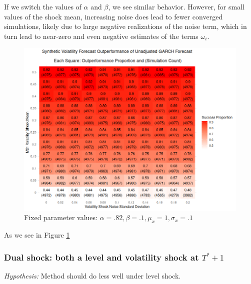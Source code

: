 \documentclass[11pt]{article}
\theoremstyle{definition}
\begin{document}
If we switch the values of $\alpha$ and $\beta$, we see similar behavior.  However, for small values of the shock mean, increasing noise does lead to fewer converged simulations, likely due to large negative realizations of the noise term, which in turn lead to near-zero and even negative estimates of the terms $\omega_{i}$.
\begin{figure}[h!]
  \begin{center}
    \includegraphics[scale=.45]{simulation_plots/standard_simulation_alpha_.82_beta_.1.png}
    \caption{Fixed parameter values: $\alpha = .82, \beta = .1, \mu_{x} = 1, \sigma_{x} = .1$}
    \label{fig:heavy_alpha}
  \end{center}
  \end{figure}
  
As we see in Figure \ref{fig:heavy_alpha}

\subsubsection{Dual shock: both a level and volatility shock at $T^{*}+1$}
\textit{Hypothesis:} Method should do less well under level shock.
\end{document}
